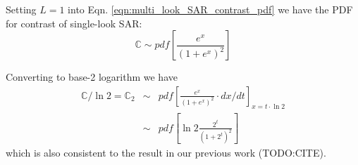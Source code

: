 Setting $L=1$ into Eqn. \ref{eqn:multi_look_SAR_contrast_pdf} 
we have the PDF for contrast of single-look SAR:
\begin{equation}
  \mathbb{C} \sim pdf \left[ \frac{e^{x}}{(1+e^x)^{2}} \right]
\end{equation}

Converting to base-2 logarithm we have
\begin{eqnarray*}
  \mathbb{C} / \ln{2} = \mathbb{C}_2 &\sim& pdf \left[ \frac{e^{x}}{(1+e^x)^{2}} \cdot dx/dt \right]_{x=t \cdot \ln{2}} \\
     &\sim& pdf \left[ \ln{2} \frac{2^t}{(1+2^t)^{2}}  \right] 
\end{eqnarray*}
which is also consistent to the result in our previous work (TODO:CITE).



